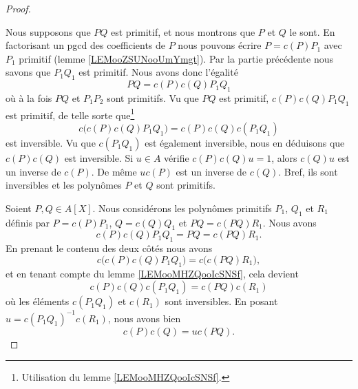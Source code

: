 \begin{proof}
\begin{subproof}
		Nous supposons que \( PQ\) est primitif, et nous montrons que \( P\) et \( Q\) le sont. En factorisant un pgcd des coefficients de \( P\) nous pouvons écrire \( P=c(P)P_1\) avec \( P_1\) primitif (lemme \ref{LEMooZSUNooUmYmgt}). Par la partie précédente nous savons que \( P_1Q_1\) est primitif. Nous avons donc l'égalité
		\begin{equation}
			PQ=c(P)c(Q)P_1Q_1
		\end{equation}
		où à la fois \( PQ\) et \( P_1P_2\) sont primitifs. Vu que \( PQ\) est primitif, \( c(P)c(Q)P_1Q_1\) est primitif, de telle sorte que\footnote{Utilisation du lemme \ref{LEMooMHZQooIcSNSf}.}
		\begin{equation}
			c\Big( c(P)c(Q)P_1Q_1 \Big)=c(P)c(Q)c(P_1Q_1)
		\end{equation}
		est inversible. Vu que \( c(P_1Q_1)\) est également inversible, nous en déduisons que \( c(P)c(Q)\) est inversible. Si \( u\in A\) vérifie \( c(P)c(Q)u=1\), alors \( c(Q)u\) est un inverse de \( c(P)\). De même \( uc(P)\) est un inverse de \( c(Q)\). Bref, ils sont inversibles et les polynômes \( P\) et \( Q\) sont primitifs.

	\end{subproof}

	Soient \( P,Q\in A[X]\). Nous considérons les polynômes primitifs \( P_1\), \( Q_1\) et \( R_1\) définis par \( P=c(P)P_1\), \( Q=c(Q)Q_1\) et \( PQ=c(PQ)R_1\). Nous avons
	\begin{equation}
		c(P)c(Q)P_1Q_1=PQ=c(PQ)R_1.
	\end{equation}
	En prenant le contenu des deux côtés nous avons
	\begin{equation}
		c\Big( c(P)c(Q)P_1Q_1 \Big)=c\Big( c(PQ)R_1 \Big),
	\end{equation}
	et en tenant compte du lemme \ref{LEMooMHZQooIcSNSf}, cela devient
	\begin{equation}
		c(P)c(Q)c(P_1Q_1)=c(PQ)c(R_1)
	\end{equation}
	où les éléments \( c(P_1Q_1)\) et \( c(R_1)\) sont inversibles. En posant \( u=c(P_1Q_1)^{-1}c(R_1)\), nous avons bien
	\begin{equation}
		c(P)c(Q)=uc(PQ).
	\end{equation}
\end{proof}

